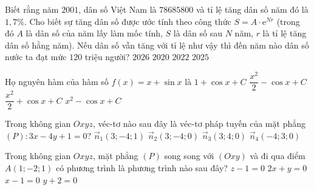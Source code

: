 \begin{ex}%
	Biết rằng năm $2001$, dân số Việt Nam là $78685800$ và tỉ lệ tăng dân số năm đó là $ 1{,}7\% $. Cho biết sự tăng dân số được ước tính theo công thức $ S=A\cdot \mathrm{e}^{Nr} $ (trong đó $ A $ là dân số của năm lấy làm mốc tính, $ S $ là dân số sau $ N $ năm, $ r $ là tỉ lệ tăng dân số hằng năm). Nếu dân số vẫn tăng với tỉ lệ như vậy thì đến năm nào dân số nước ta đạt mức $120$ triệu người?
	\choice
	{\True $ 2026 $}
	{$ 2020 $}
	{$ 2022 $}
	{$ 2025 $}
\end{ex}
\begin{ex}%
	Họ nguyên hàm của hàm số $f(x)=x+\sin x$ là 
	\choice
	{$ 1+\cos x+C $}
	{\True $ \dfrac{x^2}{2}-\cos x+C $}
	{$ \dfrac{x^2}{2} +\cos x+C $}
	{$ x^2-\cos x+C $}
	
\end{ex}
\begin{ex}%
	Trong không gian $Oxyz$, véc-tơ nào sau đây là véc-tơ pháp tuyến của mặt phẳng $(P)\colon3x-4y+1=0$?
	\choice
	{$ \vec{n}_1(3;-4;1) $}
	{\True $ \vec{n}_2(3;-4;0) $}
	{$ \vec{n}_3(3;4;0) $}
	{$ \vec{n}_4(-4;3;0) $}
	\loigiai{
	}
\end{ex}
\begin{ex}%
	Trong không gian $ Oxyz $, mặt phẳng $ (P) $ song song với $ (Oxy) $ và đi qua điểm $ A(1;-2;1) $ có phương trình là phương trình nào sau đây?
	\choice
	{\True $ z-1=0 $}
	{$ 2x+y=0 $}
	{$ x-1=0 $}
	{$ y+2=0 $}
\end{ex}
